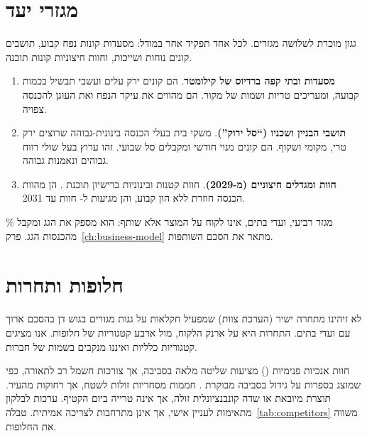 \section{מגזרי יעד}\label{sec:segments}

גגון מוכרת לשלושה מגזרים. לכל אחד תפקיד אחר במודל: מסעדות קונות נפח קבוע, תושבים קונים נוחות ושייכות, וחוות חיצוניות קונות תוכנה.

\begin{enumerate}
  \item \textbf{מסעדות ובתי קפה ברדיוס של קילומטר}. הם קונים ירק עלים ועשבי תבשיל בכמות קבועה, ומעריכים טריות ושמות של מקור. הם מהווים את עיקר הנפח ואת העוגן להכנסה צפויה.
  \item \textbf{תושבי הבניין ושכניו (\enquote{סל ירוק})}. משקי בית בעלי הכנסה בינונית-גבוהה שרוצים ירק טרי, מקומי ושקוף. הם קונים מנוי חודשי ומקבלים סל שבועי. זהו ערוץ בעל שולי רווח גבוהים ונאמנות גבוהה.
  \item \textbf{חוות ומגדלים חיצוניים (מ-2029)}. חוות קטנות ובינוניות ברישיון תוכנת . הן מהוות הכנסה חוזרת ללא הון קבוע, והן מגיעות ל-\RRsaasFarmsFinal{} חוות עד 2031.
\end{enumerate}

מגזר רביעי, ועדי בתים, אינו לקוח על המוצר אלא שותף: הוא מספק את הגג ומקבל \RRrentShare\% מהכנסות הגג. פרק~\ref{ch:business-model} מתאר את הסכם השותפות.

\section{חלופות ותחרות}\label{sec:competition}

לא זיהינו מתחרה ישיר (הערכת צוות) שמפעיל חקלאות על גגות מגורים בגוש דן בהסכם ארוך עם ועדי בתים. התחרות היא על ארנק הלקוח, מול ארבע קטגוריות של חלופות. אנו מציגים קטגוריות כלליות ואיננו מנקבים בשמות של חברות.

חוות אנכיות פנימיות () מציעות שליטה מלאה בסביבה, אך צורכות חשמל רב לתאורה, כפי שמוצג בספרות על גידול בסביבה מבוקרת \cite{kozai2020}. חממות מסחריות זולות לשטח, אך רחוקות מהעיר. תוצרת מיובאת או שדה קונבנציונלית זולה, אך אינה טרייה ביום הקטיף. ערכות לבלקון מתאימות לעניין אישי, אך אינן מתרחבות לצריכה אמיתית. טבלה~\ref{tab:competitors} משווה את החלופות.

